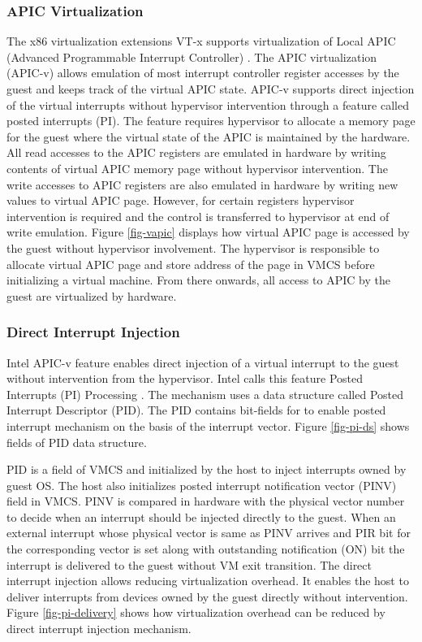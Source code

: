 \subsubsection{APIC Virtualization} \label{sec:vapic}
The x86 virtualization extensions VT-x supports virtualization of Local APIC (Advanced Programmable Interrupt Controller) \cite{intel-sdm-vol3}. 
The APIC virtualization (APIC-v) allows emulation of most interrupt controller register accesses by the guest and keeps track of the virtual APIC state. 
APIC-v supports direct injection of the virtual interrupts without hypervisor intervention through a feature called posted interrupts (PI).
The feature requires hypervisor to allocate a memory page for the guest where the virtual state of the APIC is maintained by the hardware.
All read accesses to the APIC registers are emulated in hardware by writing contents of virtual APIC memory page without hypervisor intervention.
The write accesses to APIC registers are also emulated in hardware by writing new values to virtual APIC page. 
However, for certain registers hypervisor intervention is required and the control is transferred to hypervisor at end of write emulation.
Figure \ref{fig-vapic} displays how virtual APIC page is accessed by the guest without hypervisor involvement. 
The hypervisor is responsible to allocate virtual APIC page and store address of the page in VMCS before initializing a virtual machine.
From there onwards, all access to APIC by the guest are virtualized by hardware.



\subsubsection{Direct Interrupt Injection} \label{sec:dii}
Intel APIC-v feature enables direct injection of a virtual interrupt to the guest without intervention from the hypervisor.
Intel calls this feature Posted Interrupts (PI) Processing \cite{intel-sdm-vol3}. The mechanism uses a data structure called Posted Interrupt Descriptor (PID).
The PID contains bit-fields for to enable posted interrupt mechanism on the basis of the interrupt vector.
Figure \ref{fig-pi-ds} shows fields of PID data structure.

PID is a field of VMCS and initialized by the host to inject interrupts owned by guest OS. 
The host also initializes posted interrupt notification vector (PINV) field in VMCS.
PINV is compared in hardware with the physical vector number to decide when an interrupt should be injected directly to the guest.
When an external interrupt whose physical vector is same as PINV arrives and PIR bit for the corresponding vector is set along with outstanding notification (ON) bit the interrupt is delivered to the guest without VM exit transition.
The direct interrupt injection allows reducing virtualization overhead. It enables the host to deliver interrupts from devices owned by the guest directly without
intervention. Figure \ref{fig-pi-delivery} shows how virtualization overhead can be reduced by direct interrupt injection mechanism.


